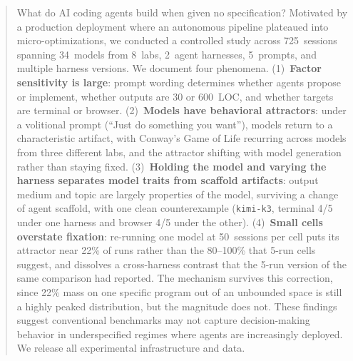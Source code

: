 \documentclass{article}
\begin{document}

\printAffiliationsAndNotice{}

\begin{abstract}
What do AI coding agents build when given no specification?
Motivated by a production deployment where an autonomous pipeline
plateaued into micro-optimizations, we conducted a controlled
study across 725~sessions spanning 34~models from 8~labs,
2~agent harnesses, 5~prompts, and multiple harness versions.
We document four phenomena. (1)~\textbf{Factor sensitivity is
large}: prompt wording determines whether agents propose or
implement, whether outputs are 30 or 600~LOC, and whether targets
are terminal or browser. (2)~\textbf{Models have behavioral
attractors}: under a volitional prompt (``Just do something you
want''), models return to a characteristic artifact, with Conway's
Game of Life recurring across models from three different labs,
and the attractor shifting with model generation rather than
staying fixed. (3)~\textbf{Holding the model and varying the
harness separates model traits from scaffold artifacts}: output
medium and topic are largely properties of the model, surviving a
change of agent scaffold, with one clean counterexample
(\texttt{kimi-k3}, terminal 4/5 under one harness and browser 4/5
under the other). (4)~\textbf{Small cells overstate fixation}:
re-running one model at 50~sessions per cell puts its attractor
near 22\% of runs rather than the 80--100\% that 5-run cells
suggest, and dissolves a cross-harness contrast that the 5-run
version of the same comparison had reported. The mechanism
survives this correction, since 22\% mass on one specific program
out of an unbounded space is still a highly peaked distribution,
but the magnitude does not. These findings suggest conventional
benchmarks may not capture decision-making behavior in
underspecified regimes where agents are increasingly deployed. We
release all experimental infrastructure and data.
\end{abstract}
\end{document}
